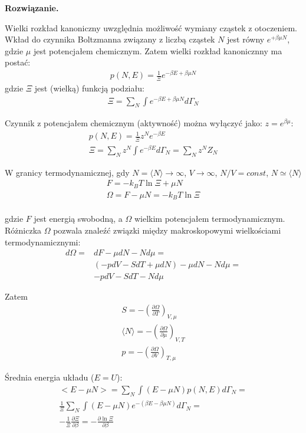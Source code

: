 \documentclass[11pt,a4paper]{article}
\newcommand{\Partial}[3]{\left( \frac{\partial #1}{\partial #2} \right)_{#3}}
\newenvironment{solution}{\vspace{1cm} \par\textbf{Rozwiązanie.} \vspace{1cm}}{}
\begin{document}
\begin{solution}

Wielki rozkład kanoniczny uwzględnia możliwość wymiany cząstek z otoczeniem.
Wkład do czynnika Boltzmanna związany z liczbą cząstek $N$ jest 
równy $e^{+\beta \mu N}$, gdzie $\mu$ jest potencjałem chemicznym.
Zatem wielki rozkład kanonicznny ma postać:
\begin{align*}
  p(N, E) = \frac{1}{\Xi} e^{-\beta E + \beta \mu N}
\end{align*}
gdzie $\Xi$ jest (wielką) funkcją podziału:
\begin{align*}
  \Xi = \sum_{N} \int e^{-\beta E + \beta \mu N} d\Gamma_{N}
\end{align*}

Czynnik z potencjałem chemicznym (aktywność) można wyłączyć jako: 
$z = e^{\beta \mu}$:
\begin{align*}
  p(N, E) = \frac{1}{\Xi} z^N e^{-\beta E} \\
  \Xi = \sum_{N} z^N \int e^{-\beta E} d\Gamma_{N} = \sum_{N} z^N Z_N
\end{align*}

W granicy termodynamicznej, gdy
$N = \langle N \rangle \to \infty$, $V \to \infty$, $N/V = const$,
$ N \simeq \langle N \rangle$
\begin{align*}
  F = -k_B T \ln \Xi + \mu N \\
  \Omega = F - \mu N  = -k_B T \ln \Xi \\
\end{align*}

gdzie $F$ jest energią swobodną, a $\Omega$ wielkim potencjałem termodynamicznym.
Różniczka $\Omega$ pozwala znaleźć związki między makroskopowymi wielkościami 
termodynamicznymi:
\begin{align*}
  d \Omega =& dF - \mu dN - N d\mu = \\
            &(-pdV - S dT + \mu dN) - \mu dN - N d\mu = \\
            &-pdV - S dT - N d\mu 
\end{align*}

Zatem \begin{align*}
  S = -\Partial{\Omega}{T}{V, \mu} \\
  \langle N \rangle = -\Partial{\Omega}{\mu}{V, T} \\
  p = -\Partial{\Omega}{V}{T, \mu}
\end{align*}

Średnia energia układu ($E= U$):
\begin{align*}
  <E - \mu N> = \sum_{N} \int (E - \mu N) p(N, E) d\Gamma_N = \\
  \frac{1}{\Xi} \sum_{N} \int (E - \mu N) e^{-(\beta E - \beta \mu N)} d\Gamma_N = \\
  -\frac{1}{\Xi} \frac{\partial \Xi}{\partial \beta} = 
  -\frac{\partial \ln \Xi}{\partial \beta}
\end{align*}


\end{solution}
\end{document}
